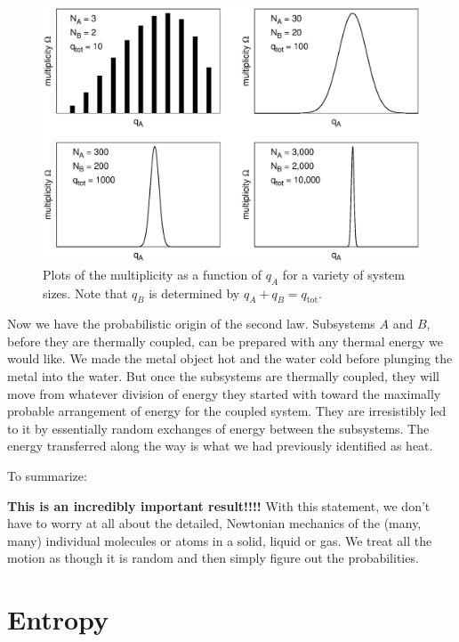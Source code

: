 \begin{figure}
\begin{center}
\includegraphics[width=5in]{second_law_and_entropy/multiplicity_with_size.eps}
\caption{Plots of the multiplicity as a function of $q_A$ for a
  variety of system sizes.  Note that $q_B$ is determined by
  $q_A+q_B=q_\text{tot}$.} 
\label{fig:multiplicity_with_size}
\end{center}
\end{figure}

Now we have the probabilistic origin of the second law.  Subsystems
$A$ and $B$, before they are thermally coupled, can be prepared with
any thermal energy we would like.  We made the metal object hot and
the water cold before plunging the metal into the water.  But once the
subsystems are thermally coupled, they will move from whatever
division of energy they started with toward the maximally probable
arrangement of energy for the coupled system.  They are irresistibly
led to it by essentially random exchanges of energy between the
subsystems.  The energy transferred along the way is what we had
previously identified as heat.

To summarize:

\break
{\bf This is an incredibly important result!!!!}  With this
statement, we don't have to worry at all about the detailed,
Newtonian mechanics of the (many, many) individual molecules or
atoms in a solid, liquid or gas.  We treat all the motion as though
it is random and then simply figure out the probabilities.  

\section{Entropy}

